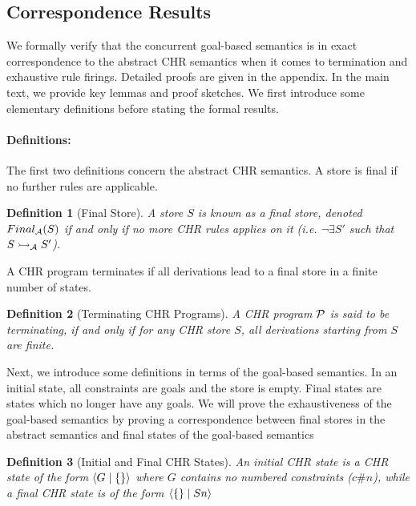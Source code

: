 \documentclass{tlp}
\newtheorem{definition}{Definition}[section]
\begin{document}
\subsection{Correspondence Results} \label{ssec:corr}

We formally verify that the concurrent goal-based semantics is in exact correspondence
to the abstract CHR semantics when it comes to termination and exhaustive rule firings.
Detailed proofs are given in the appendix. In the main text, we provide key lemmas 
and proof sketches.
We first introduce some elementary definitions before stating the formal results.

\paragraph{\bf Definitions:}

The first two definitions concern the abstract CHR semantics.
A store is final if no further rules are applicable.

\begin{definition} [Final Store] \label{def:final-store}
    A store $S$ is known as a final store, denoted $Final_{\cal A}(S)$
   if and only if no more CHR rules applies on it (i.e. $\neg \exists S'$ such that
   $S \rightarrowtail_{\cal A} S'$).
\end{definition}

A CHR program terminates if all derivations lead to a final store in 
a finite number of states.


\begin{definition} [Terminating CHR Programs] \label{def:terminate}
  A CHR program $\cal P$ is said to be terminating, if and only if for any CHR store $S$,
  all derivations starting from $S$ are finite.
\end{definition}

Next, we introduce some definitions in terms of the goal-based semantics. In an initial state, all 
constraints are goals and the store is empty. Final states are states which no longer have any 
goals. We will prove the exhaustiveness of the goal-based semantics by proving a correspondence
between final stores in the abstract semantics and final states of the goal-based semantics

\begin{definition} [Initial and Final CHR States] \label{def:init-fin-state}
   An initial CHR state is a CHR state of the form $\langle G\mid\{\} \rangle$ where $G$ 
   contains no numbered constraints ($c\#n$), while a final CHR state is of the form 
   $\langle \{\}\mid Sn \rangle$
\end{definition}
\end{document}
